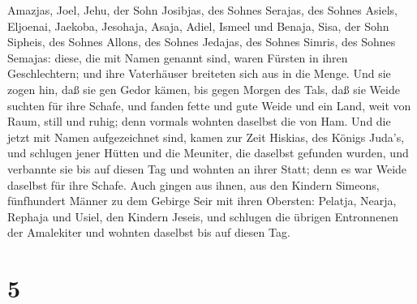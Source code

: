 Amazjas,  Joel, Jehu, der Sohn Josibjas, des Sohnes
Serajas, des Sohnes Asiels,  Eljoenai, Jaekoba, Jesohaja,
Asaja, Adiel, Ismeel und Benaja,  Sisa, der Sohn Sipheis,
des Sohnes Allons, des Sohnes Jedajas, des Sohnes Simris, des Sohnes
Semajas:  diese, die mit Namen genannt sind, waren Fürsten
in ihren Geschlechtern; und ihre Vaterhäuser breiteten sich aus in die
Menge.  Und sie zogen hin, daß sie gen Gedor kämen, bis
gegen Morgen des Tals, daß sie Weide suchten für ihre Schafe,
 und fanden fette und gute Weide und ein Land, weit von
Raum, still und ruhig; denn vormals wohnten daselbst die von Ham.
 Und die jetzt mit Namen aufgezeichnet sind, kamen zur Zeit
Hiskias, des Königs Juda's, und schlugen jener Hütten und die Meuniter,
die daselbst gefunden wurden, und verbannte sie bis auf diesen Tag und
wohnten an ihrer Statt; denn es war Weide daselbst für ihre Schafe.
 Auch gingen aus ihnen, aus den Kindern Simeons,
fünfhundert Männer zu dem Gebirge Seir mit ihren Obersten: Pelatja,
Nearja, Rephaja und Usiel, den Kindern Jeseis,  und
schlugen die übrigen Entronnenen der Amalekiter und wohnten daselbst bis
auf diesen Tag.

\hypertarget{section-4}{%
\section{5}\label{section-4}}

